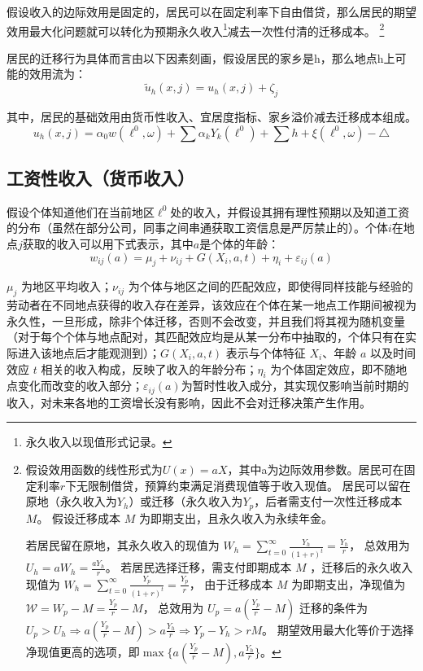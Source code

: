 \documentclass[a4paper,12pt]{article}
\begin{document}
假设收入的边际效用是固定的，居民可以在固定利率下自由借贷，那么居民的期望效用最大化问题就可以转化为预期永久收入\footnote{永久收入以现值形式记录。}减去一次性付清的迁移成本。
\footnote{
假设效用函数的线性形式为$U(x)=a X$，其中a为边际效用参数。居民可在固定利率$r$下无限制借贷，预算约束满足消费现值等于收入现值。
居民可以留在原地（永久收入为$Y_h$）或迁移（永久收入为$Y_p$，后者需支付一次性迁移成本 $M$。
假设迁移成本 
$M$
为即期支出，且永久收入为永续年金。

若居民留在原地，其永久收入的现值为
$W_h = \sum\limits_{t=0}^\infty \frac{Y_h}{(1+r)^t}=\frac{Y_h}{r}$，
总效用为$U_h=a W_h = \frac{a Y_h}{r}$。
若居民选择迁移，需支付即期成本 
$M$
，迁移后的永久收入现值为
$W_h = \sum\limits_{t=0}^\infty \frac{Y_p}{(1+r)^t}=\frac{Y_p}{r}$，
由于迁移成本 
$M$
为即期支出，净现值为
$\mathcal{W}=W_p-M=\frac{Y_p}{r}-M$，
总效用为
$U_p=a(\frac{Y_p}{r}-M)$
迁移的条件为$U_p>U_h \Rightarrow a(\frac{Y_p}{r}-M) > a \frac{ Y_h}{r} \Rightarrow Y_p-Y_h > rM$。
期望效用最大化等价于选择净现值更高的选项，即$\max\{a(\frac{Y_p}{r}-M), a \frac{ Y_h}{r}\}$。
}


居民的迁移行为具体而言由以下因素刻画，假设居民的家乡是h，那么地点h上可能的效用流为：
\begin{equation}
  \tilde u_{h}(x,j)=u_{h}(x,j) +\zeta_j
\end{equation}

其中，居民的基础效用由货币性收入、宜居度指标、家乡溢价减去迁移成本组成。
\begin{equation}
  u_h(x,j)=\alpha_0 w(\ell^0,\omega)+\sum\limits \alpha_{k}Y_{k}(\ell^{0})+\sum\limits h +\xi(\ell^{0},\omega)-\triangle
\end{equation}

\subsection{工资性收入（货币收入）}
假设个体知道他们在当前地区$\ell^0$处的收入，并假设其拥有理性预期以及知道工资的分布（虽然在部分公司，同事之间串通获取工资信息是严厉禁止的）。个体$i$在地点$j$获取的收入可以用下式表示，其中$a$是个体的年龄：
\begin{equation}
  w_{ij}(a)=\mu_j+\nu_{ij}+G(X_i,a,t)+\eta_i+\varepsilon_{ij}(a)
\end{equation}

$\mu_j$ 为地区平均收入；$\nu_{ij}$ 为个体与地区之间的匹配效应，即使得同样技能与经验的劳动者在不同地点获得的收入存在差异，该效应在个体在某一地点工作期间被视为永久性，一旦形成，除非个体迁移，否则不会改变，并且我们将其视为随机变量（对于每个个体与地点配对，其匹配效应均是从某一分布中抽取的，个体只有在实际进入该地点后才能观测到）；$G(X_i,a,t)$ 表示与个体特征 $X_i$、年龄 $a$ 以及时间效应 $t$ 相关的收入构成，反映了收入的年龄分布；$\eta_i$ 为个体固定效应，即不随地点变化而改变的收入部分；$\varepsilon_{ij}(a)$为暂时性收入成分，其实现仅影响当前时期的收入，对未来各地的工资增长没有影响，因此不会对迁移决策产生作用。
\end{document}
